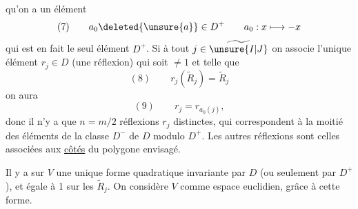   qu'on a un élément
 
\[
(7)\qquad a_0\deleted{\unsure{a}}\in D^+
\qquad a_0:x\longmapsto-x
\]
qui est en fait le seul élément  $D^+$.
Si à tout $j\in\widetilde{\unsure{I|J}}$ on associe l'unique
 élément $r_j\in D$ (une réflexion)
 qui soit $\ne1$ et telle que
\[
(8)\qquad r_j(\widetilde R_j)=\widetilde R_j
\]
on aura
\[
(9)\qquad r_j=r_{a_0(j)},
\]
 donc il n'y a que $n=m/2$ réflexions $r_j$ distinctes,
qui correspondent à la moitié des éléments de la classe 
$D^-$ de $D$ modulo $D^+$. Les autres réflexions sont celles associées aux
\uline{côtés} du polygone envisagé.

Il y a sur $V$ une unique forme quadratique invariante par $D$
(ou seulement par $D^+$), et égale à 1 sur les $\widetilde R_j$.
On considère $V$ comme espace  euclidien, grâce à cette forme.

